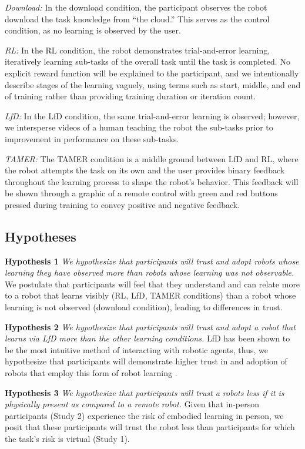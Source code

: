 \documentclass[letterpaper]{article} %
\begin{document}
\textit{Download: }In the download condition, the participant observes the robot download the task knowledge from ``the cloud.'' This serves as the control condition, as no learning is observed by the user.

\textit{RL: }In the RL condition, the robot demonstrates trial-and-error learning, iteratively learning sub-tasks of the overall task until the task is completed. No explicit reward function will be explained to the participant, and we intentionally describe stages of the learning vaguely, using terms such as start, middle, and end of training rather than providing training duration or iteration count.

\textit{LfD: }In the LfD condition, the same trial-and-error learning is observed; however, we intersperse videos of a human teaching the robot the sub-tasks prior to improvement in performance on these sub-tasks.

\textit{TAMER: }The TAMER condition is a middle ground between LfD and RL, where the robot attempts the task on its own and the user provides binary feedback throughout the learning process to shape the robot's behavior. This feedback will be shown through a graphic of a remote control with green and red buttons pressed during training to convey positive and negative feedback.

\subsection{Hypotheses}
\label{sec:hypotheses}

\textbf{Hypothesis 1} \textit{We hypothesize that participants will trust and adopt robots whose learning they have observed more than robots whose learning was not observable.} We postulate that participants will feel that they understand and can relate more to a robot that learns visibly (RL, LfD, TAMER conditions) than a robot whose learning is not observed (download condition), leading to differences in trust.

\textbf{Hypothesis 2} \textit{We hypothesize that participants will trust and adopt a robot that learns via LfD more than the other learning conditions.} LfD has been shown to be the most intuitive method of interacting with robotic agents, thus, we hypothesize that participants will demonstrate higher trust in and adoption of robots that employ this form of robot learning \cite{7451754, Akgun2011RobotLF}.

\textbf{Hypothesis 3} \textit{We hypothesize that participants will trust a robots less if it is physically present as compared to a remote robot.} Given that in-person participants (Study 2) experience the risk of embodied learning in person, we posit that these participants will trust the robot less than participants for which the task's risk is virtual (Study 1).
\end{document}
